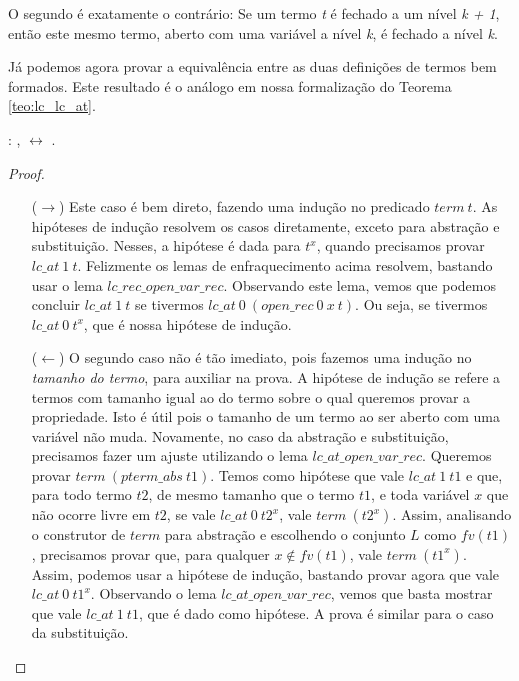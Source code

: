 O segundo é exatamente o contrário: Se um termo \emph{t} é fechado a um nível
\emph{k + 1}, então este mesmo termo, aberto com uma variável a nível \emph{k},
é fechado a nível \emph{k}.

Já podemos agora provar a equivalência entre as duas definições de termos bem
formados. Este resultado é o análogo em nossa formalização do Teorema
\ref{teo:lc_lc_at}.

\bigskip
{}  : \coqdockw{\ensuremath{\forall}}
,   \ensuremath{\leftrightarrow}
 .\coqdoceol
\bigskip

\begin{proof}
    $ $\par\nobreak\ignorespaces
\begin{itemize}
    \item[($\rightarrow$)] Este caso é bem direto, fazendo uma indução no
        predicado $term\ t$. As hipóteses de indução resolvem os casos
        diretamente, exceto para abstração e substituição. Nesses, a hipótese é
        dada para $t^x$, quando precisamos provar $lc\_at\ 1\ t$. Felizmente os
        lemas de enfraquecimento acima resolvem, bastando usar o lema
        $lc\_rec\_open\_var\_rec$. Observando este lema, vemos que podemos
        concluir $lc\_at\ 1\ t$ se tivermos $lc\_at\ 0 \ (open\_rec\ 0\ x\ t)$.
        Ou seja, se tivermos $lc\_at\ 0\ t^x$, que é nossa hipótese de indução.

    \item[($\leftarrow$)] O segundo caso não é tão imediato, pois fazemos uma
        indução no \emph{tamanho do termo}, para auxiliar na prova. A hipótese
        de indução se refere a termos com tamanho igual ao do termo sobre o qual
        queremos provar a propriedade. Isto é útil pois o tamanho de um termo ao
        ser aberto com uma variável não muda. Novamente, no caso da abstração e
        substituição, precisamos fazer um ajuste utilizando o lema
        $lc\_at\_open\_var\_rec$. Queremos provar $term\ (pterm\_abs\ t1)$. Temos
        como hipótese que vale $lc\_at\ 1\ t1$ e que, para todo termo $t2$, de
        mesmo tamanho que o termo $t1$, e toda variável $x$ que não ocorre livre
        em $t2$, se vale $lc\_at\ 0\ t2^x$, vale $term\ (t2^x)$. Assim,
        analisando o construtor de $term$ para abstração e escolhendo o conjunto
        $L$ como $fv(t1)$, precisamos provar que, para qualquer $x \notin
        fv(t1)$, vale $term\ (t1^x)$. Assim, podemos usar a hipótese de indução,
        bastando provar agora que vale $lc\_at\ 0\ t1^x$. Observando o lema
        $lc\_at\_open\_var\_rec$, vemos que basta mostrar que vale $lc\_at\ 1\
        t1$, que é dado como hipótese. A prova é similar para o caso da
        substituição.
\end{itemize}
\end{proof}

